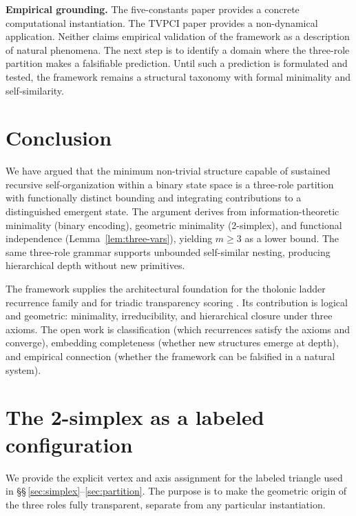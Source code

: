 \documentclass[12pt]{article}
\theoremstyle{definition}
\theoremstyle{remark}
\begin{document}
\textbf{Empirical grounding.}  The five-constants paper \cite{Mil24} provides a concrete
computational instantiation.  The TVPCI paper \cite{Mil24} provides a non-dynamical
application.  Neither claims empirical validation of the framework as a description of
natural phenomena.  The next step is to identify a domain where the three-role partition
makes a falsifiable prediction.  Until such a prediction is formulated and tested, the
framework remains a structural taxonomy with formal minimality and self-similarity.

\section{Conclusion}\label{sec:conclusion}

We have argued that the minimum non-trivial structure capable of sustained recursive
self-organization within a binary state space is a three-role partition with functionally
distinct bounding and integrating contributions to a distinguished emergent state.
The argument derives from information-theoretic minimality (binary encoding), geometric
minimality (2-simplex), and functional independence (Lemma~\ref{lem:three-vars}),
yielding $m \ge 3$ as a lower bound.  The same three-role grammar supports unbounded
self-similar nesting, producing hierarchical depth without new primitives.

The framework supplies the architectural foundation for the tholonic ladder recurrence
family \cite{Mil24} and for triadic transparency scoring \cite{Mil24}.  Its contribution
is logical and geometric: minimality, irreducibility, and hierarchical closure under
three axioms.  The open work is classification (which recurrences satisfy the axioms
and converge), embedding completeness (whether new structures emerge at depth), and
empirical connection (whether the framework can be falsified in a natural system).




\appendix
\section{The 2-simplex as a labeled configuration}\label{app:simplex}

We provide the explicit vertex and axis assignment for the labeled triangle used in
\S\S\,\ref{sec:simplex}--\ref{sec:partition}.  The purpose is to make the geometric
origin of the three roles fully transparent, separate from any particular instantiation.
\end{document}
